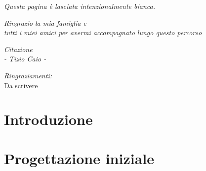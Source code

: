 \documentclass[12pt,a4paper]{book}
\newcommand{\intentblankpage}{
    \newpage
    \null
    \vfill
    \thispagestyle{empty}
    \begin{center}
        \textit{Questa pagina \`e lasciata intenzionalmente bianca.}
    \end{center}
    \newpage
}
\newlength{\sixtyfivecharwidth}
\begin{document}
    
    \intentblankpage
    
    \vspace*{50mm}
        
    \vspace*{50mm}
    \begin{flushright}
        \textit{\large Ringrazio la mia famiglia e \\ tutti i miei amici per avermi accompagnato lungo questo percorso}
    \end{flushright}
    
    \newpage
    
    \vspace*{30mm}
    \begin{flushright}
        \textit{\large Citazione 
            \\ \vspace{5mm}  - Tizio Caio -}
    \end{flushright}
    
    \vfill
    
    \noindent \hspace{20mm} \textit{\large{Ringraziamenti:}} \vspace{5mm}\\
    Da scrivere
    
    \newpage
    \tableofcontents
    
    \chapter*{Introduzione}
    
    
    \chapter{Progettazione iniziale}
    \label{CH:Teoria}
    
    
\end{document}
